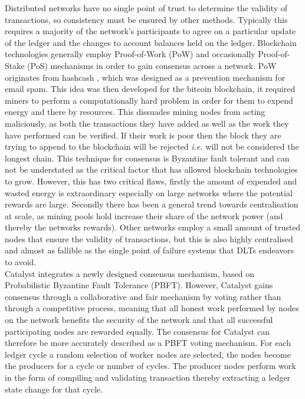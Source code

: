 Distributed networks have no single point of trust to determine the validity of transactions, so consistency must be ensured by other methods. Typically this requires a majority of the network's participants to agree on a particular update of the ledger and the changes to account balances held on the ledger. Blockchain technologies generally employ Proof-of-Work (PoW) and occasionally Proof-of-Stake (PoS) mechanisms in order to gain consensus across a network. PoW originates from hashcash \cite{back2002hashcash}, which was designed as a prevention mechanism for email spam. This idea was then developed for the bitcoin blockchain, it required miners to perform a computationally hard problem in order for them to expend energy and there by resources. This dissuades mining nodes from acting maliciously, as both the transactions they have added as well as the work they have performed can be verified. If their work is poor then the block they are trying to append to the blockchain will be rejected \textit{i.e.} will not be considered the longest chain. This technique for consensus is Byzantine fault tolerant and can not be understated as the critical factor that has allowed blockchain technologies to grow. However, this has two critical flaws, firstly the amount of expended and wasted energy is extraordinary especially on large networks where the potential rewards are large. Secondly there has been a general trend towards centralisation at scale, as mining pools hold increase their share of the network power (and thereby the networks rewards). Other networks employ a small amount of trusted nodes that ensure the validity of transactions, but this is also highly centralised and almost as fallible as the single point of failure systems that DLTs endeavors to avoid. \\


Catalyst integrates a newly designed consensus mechanism, based on Probabilistic Byzantine Fault Tolerance (PBFT). However, Catalyst gains consensus through a collaborative and fair mechanism by voting rather than through a competitive process, meaning that all honest work performed by nodes on the network benefits the security of the network and that all successful participating nodes are rewarded equally. The consensus for Catalyst can therefore be more accurately described as a PBFT voting mechanism. For each ledger cycle a random selection of worker nodes are selected, the nodes become the producers for a cycle or number of cycles. The producer nodes perform work in the form of compiling and validating transaction thereby extracting a ledger state change for that cycle. \\

